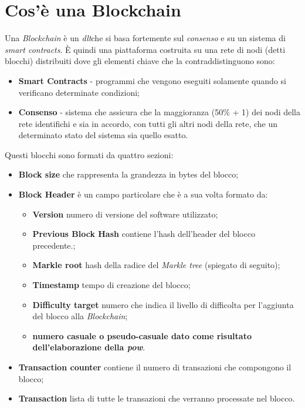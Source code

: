 \section{Cos'è una Blockchain}
Una \textit{Blockchain} è un \emph{\gls{dlt}}\glsfirstoccur che si basa fortemente sul \textit{consenso} e su un sistema di \textit{smart contracts}.
È quindi una piattaforma costruita su una rete di nodi (detti blocchi) distribuiti dove gli elementi chiave che la contraddistinguono sono:
\begin{itemize}
	\item \textbf{Smart Contracts} - programmi che vengono eseguiti solamente quando si verificano determinate condizioni;
	\item \textbf{Consenso} - sistema che assicura che la maggioranza (50\% + 1) dei nodi della rete identifichi e sia in accordo, con tutti gli altri nodi della rete, che un determinato stato del sistema sia quello esatto.
\end{itemize}
Questi blocchi sono formati da quattro sezioni:
\begin{itemize}
	\item \textbf{Block size} che rappresenta la grandezza in bytes del blocco;
	\item \textbf{Block Header} è un campo particolare che è a sua volta formato da:
	\begin{itemize}
		\item \textbf{Version} numero di versione del software utilizzato;
		\item \textbf{Previous Block Hash} contiene l'hash dell'header del blocco precedente.;
		\item \textbf{Markle root} hash della radice del \textit{Markle tree} (spiegato di seguito);
		\item \textbf{Timestamp} tempo di creazione del blocco;
		\item \textbf{Difficulty target} numero che indica il livello di difficolta per l'aggiunta del blocco alla \textit{Blockchain};
		\item \textbf{numero casuale o pseudo-casuale dato come risultato dell'elaborazione della \emph{\gls{pow}}\glsfirstoccur}.
	\end{itemize}
	\item \textbf{Transaction counter} contiene il numero di transazioni che compongono il blocco;
	\item \textbf{Transaction} lista di tutte le transazioni che verranno processate nel blocco.
\end{itemize}
